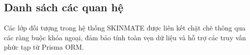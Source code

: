 \documentclass[12pt,a4paper]{article}
\begin{document}



\subsection{Danh sách các quan hệ}

Các lớp đối tượng trong hệ thống SKINMATE được liên kết chặt chẽ thông qua các ràng buộc khóa ngoại, đảm bảo tính toàn vẹn dữ liệu và hỗ trợ các truy vấn phức tạp từ Prisma ORM.
\end{document}
